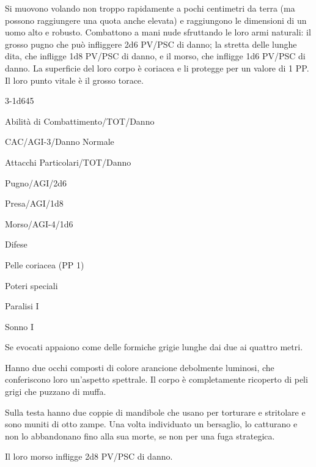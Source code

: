 Si muovono volando non troppo rapidamente a pochi centimetri da terra
(ma possono raggiungere una quota anche elevata) e raggiungono le
dimensioni di un uomo alto e robusto.  Combattono a mani nude
sfruttando le loro armi naturali: il grosso pugno che pu\`o
infliggere 2d6 PV/PSC di danno; la stretta delle lunghe dita, che
infligge 1d8 PV/PSC di danno, e il morso, che infligge 1d6 PV/PSC di
danno. La superficie del loro corpo \`e coriacea e li protegge per
un valore di 1 PP. Il loro punto vitale \`e il grosso torace.

{3-1d6}{45}

\begin{parmostro}{Abilit\`a di Combattimento/TOT/Danno}
\item CAC/AGI-3/Danno Normale
\end{parmostro}

\begin{parmostro}{Attacchi Particolari/TOT/Danno}
\item Pugno/AGI/2d6
\item Presa/AGI/1d8
\item Morso/AGI-4/1d6
\end{parmostro}

\begin{parmostro}{Difese}
\item Pelle coriacea (PP 1)
\end{parmostro}

\begin{parmostro}{Poteri speciali}
\item Paralisi I
\item Sonno I
\end{parmostro}


Se evocati appaiono come delle formiche grigie lunghe dai due ai
quattro metri.

Hanno due occhi composti di colore arancione debolmente luminosi, che
conferiscono loro un'aspetto spettrale. Il corpo \`e
completamente ricoperto di peli grigi che puzzano di muffa. 

Sulla testa hanno due coppie di mandibole che usano per torturare e
stritolare e sono muniti di otto zampe. Una volta individuato un
bersaglio, lo catturano e non lo abbandonano fino alla sua morte, se
non per una fuga strategica. 

Il loro morso infligge 2d8 PV/PSC di danno. 

